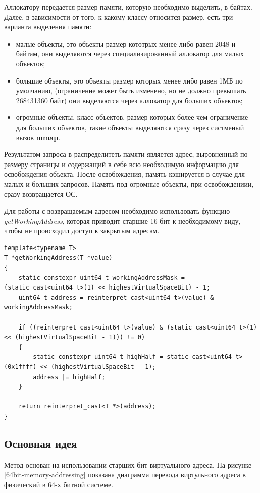 Аллокатору передается размер памяти, которую необходимо выделить, в байтах. Далее, в зависимости от того, к какому классу относится размер, есть три варианта выделения памяти:
\begin{itemize}
	\item малые объекты, это объекты размер кототрых менее либо равен 2048-и байтам, они выделяются через специализированный аллокатор для малых объектов;
	\item большие объекты, это объекты размер которых менее либо равен 1МБ по умолчанию, (ограничение может быть изменено, но не должно превышать 268431360 байт) они выделяются через аллокатор для больших объектов;
	\item огромные объекты, класс объектов, размер которых более чем ограничение для больших объектов, такие объекты выделяются сразу через систменый вызов \textbf{mmap}.
\end{itemize}

Результатом запроса в распределитеть памяти является адрес, выровненный по размеру страницы и содержащий в себе всю необходимую информацию для освобождения объекта. После освобождения, память кэшируется в случае для малых и больших запросов. Память под огромные объекты, при освобождениии, сразу возвращается ОС.

Для работы с возвращаемым адресом необходимо использовать функцию \textit{getWorkingAddress}, которая приводит старшие 16 бит к необходимому виду, чтобы не происходил доступ к закрытым адресам.

\begin{lstlisting}
template<typename T>
T *getWorkingAddress(T *value)
{
	static constexpr uint64_t workingAddressMask = (static_cast<uint64_t>(1) << highestVirtualSpaceBit) - 1;
	uint64_t address = reinterpret_cast<uint64_t>(value) & workingAddressMask;
		
	if ((reinterpret_cast<uint64_t>(value) & (static_cast<uint64_t>(1) << (highestVirtualSpaceBit - 1))) != 0)
	{
		static constexpr uint64_t highHalf = static_cast<uint64_t>(0x1ffff) << (highestVirtualSpaceBit - 1);
		address |= highHalf;
	}

	return reinterpret_cast<T *>(address);
}
\end{lstlisting}

\subsection{Основная идея}
Метод основан на использовании старших бит виртуального адреса. На рисунке \ref{64bit-memory-addressing} показана диаграмма перевода виртульного адреса в физический в 64-х битной системе.

